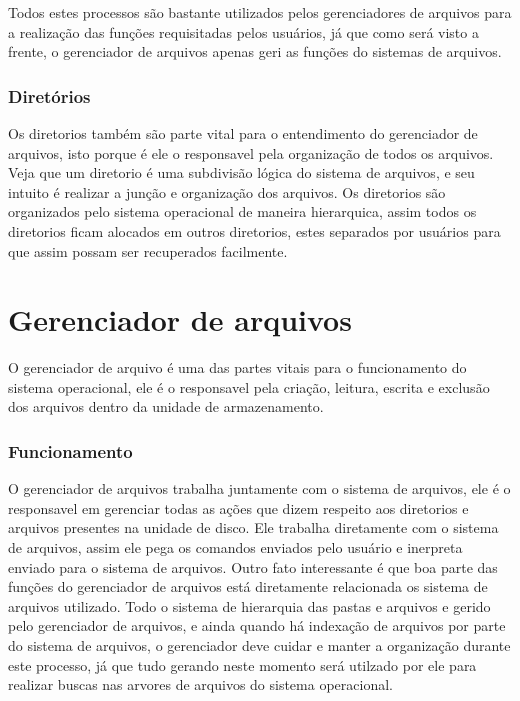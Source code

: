 \documentclass[
	12pt,				%
	openright,			%
	twoside,			%
	a4paper,			%
	chapter=TITLE,		%
	section=TITLE,		%
	english,	
	brazil				%
]{abntex2}
\begin{document}
Todos estes processos são bastante utilizados pelos gerenciadores de arquivos para a realização das funções requisitadas pelos usuários, já que como será visto a frente, o gerenciador de arquivos apenas geri as funções do sistemas de arquivos.

\subsection{Diretórios}

Os diretorios também são parte vital para o entendimento do gerenciador de arquivos, isto porque é ele o responsavel pela organização de todos os arquivos. Veja que um diretorio é uma subdivisão lógica do sistema de arquivos, e seu intuito é  realizar a junção e organização dos arquivos.
Os diretorios são organizados pelo sistema operacional de maneira hierarquica, assim todos os diretorios ficam alocados em outros diretorios, estes separados por usuários para que assim possam ser recuperados facilmente.

\chapter{Gerenciador de arquivos}

O gerenciador de arquivo é uma das partes vitais para o funcionamento do sistema operacional, ele é o responsavel pela criação, leitura, escrita e exclusão dos arquivos dentro da unidade de armazenamento.

\subsection{Funcionamento}

O gerenciador de arquivos trabalha juntamente com o sistema de arquivos, ele é o responsavel em gerenciar todas as ações que dizem respeito aos diretorios e arquivos presentes na unidade de disco. Ele trabalha diretamente com o sistema de arquivos, assim ele pega os comandos enviados pelo usuário e inerpreta enviado para o sistema de arquivos. Outro fato interessante é que boa parte das funções do gerenciador de arquivos está diretamente relacionada os sistema de arquivos utilizado.
Todo o sistema de hierarquia das pastas e arquivos e gerido pelo gerenciador de arquivos, e ainda quando há indexação de arquivos por parte do sistema de arquivos, o gerenciador deve cuidar e manter a organização durante este processo, já que tudo gerando neste momento será utilzado por ele para realizar buscas nas arvores de arquivos do sistema operacional.
\end{document}
